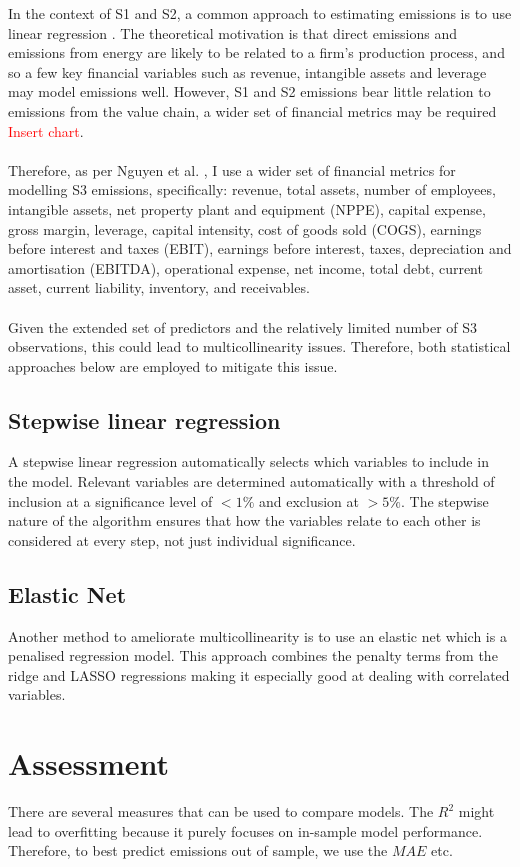 \documentclass[12pt,twoside]{report}
\begin{document}
In the context of S1 and S2, a common approach to estimating emissions is to use linear regression \cite{GoldhammerEtAl2017, Griffin2017}. The theoretical motivation is that direct emissions and emissions from energy are likely to be related to a firm's production process, and so a few key financial variables such as revenue, intangible assets and leverage may model emissions well. However, S1 and S2 emissions bear little relation to emissions from the value chain, a wider set of financial metrics may be required \textcolor{red}{Insert chart}. 
\\\\
Therefore, as per Nguyen et al. \cite{Nguyenetal2023}, I use a wider set of financial metrics for modelling S3 emissions, specifically: revenue, total assets, number of employees, intangible assets, net property plant and equipment (NPPE), capital expense, gross margin, leverage, capital intensity, cost of goods sold (COGS), earnings before interest and taxes (EBIT), earnings before interest, taxes, depreciation and amortisation (EBITDA), operational expense, net income, total debt, current asset, current liability, inventory, and receivables. 
\\\\
Given the extended set of predictors and the relatively limited number of S3 observations, this could lead to multicollinearity issues. Therefore, both statistical approaches below are employed to mitigate this issue.

\subsection{Stepwise linear regression}

A stepwise linear regression automatically selects which variables to include in the model. Relevant variables are determined automatically with a threshold of inclusion at a significance level of $<1\%$ and exclusion at $>5\%$. The stepwise nature of the algorithm ensures that how the variables relate to each other is considered at every step, not just individual significance. 

\subsection{Elastic Net}

Another method to ameliorate multicollinearity is to use an elastic net which is a penalised regression model. This approach combines the penalty terms from the ridge and LASSO regressions making it especially good at dealing with correlated variables. 

\section{Assessment}

There are several measures that can be used to compare models. The $R^{2}$ might lead to overfitting because it purely focuses on in-sample model performance. Therefore, to best predict emissions out of sample, we use the $MAE$ etc.



\end{document}

